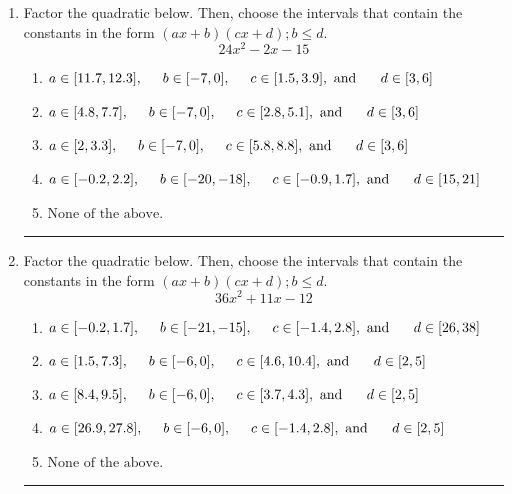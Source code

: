 \documentclass[14pt]{extbook}
\newcommand{\litem}[1]{\item#1\hspace*{-1cm}\rule{\textwidth}{0.4pt}}
\begin{document}
\begin{enumerate}
{\begin{enumerate}[label=\Alph*.]
\end{enumerate} }
\litem{
Factor the quadratic below. Then, choose the intervals that contain the constants in the form $(ax+b)(cx+d); b \leq d.$\[ 24x^{2} -2 x -15 \]\begin{enumerate}[label=\Alph*.]
\item \( a \in [11.7, 12.3], \hspace*{5mm} b \in [-7, 0], \hspace*{5mm} c \in [1.5, 3.9], \text{ and } \hspace*{5mm} d \in [3, 6] \)
\item \( a \in [4.8, 7.7], \hspace*{5mm} b \in [-7, 0], \hspace*{5mm} c \in [2.8, 5.1], \text{ and } \hspace*{5mm} d \in [3, 6] \)
\item \( a \in [2, 3.3], \hspace*{5mm} b \in [-7, 0], \hspace*{5mm} c \in [5.8, 8.8], \text{ and } \hspace*{5mm} d \in [3, 6] \)
\item \( a \in [-0.2, 2.2], \hspace*{5mm} b \in [-20, -18], \hspace*{5mm} c \in [-0.9, 1.7], \text{ and } \hspace*{5mm} d \in [15, 21] \)
\item \( \text{None of the above.} \)

\end{enumerate} }
\litem{
Factor the quadratic below. Then, choose the intervals that contain the constants in the form $(ax+b)(cx+d); b \leq d.$\[ 36x^{2} +11 x -12 \]\begin{enumerate}[label=\Alph*.]
\item \( a \in [-0.2, 1.7], \hspace*{5mm} b \in [-21, -15], \hspace*{5mm} c \in [-1.4, 2.8], \text{ and } \hspace*{5mm} d \in [26, 38] \)
\item \( a \in [1.5, 7.3], \hspace*{5mm} b \in [-6, 0], \hspace*{5mm} c \in [4.6, 10.4], \text{ and } \hspace*{5mm} d \in [2, 5] \)
\item \( a \in [8.4, 9.5], \hspace*{5mm} b \in [-6, 0], \hspace*{5mm} c \in [3.7, 4.3], \text{ and } \hspace*{5mm} d \in [2, 5] \)
\item \( a \in [26.9, 27.8], \hspace*{5mm} b \in [-6, 0], \hspace*{5mm} c \in [-1.4, 2.8], \text{ and } \hspace*{5mm} d \in [2, 5] \)
\item \( \text{None of the above.} \)


\end{enumerate}}
\end{enumerate}
\end{document}
